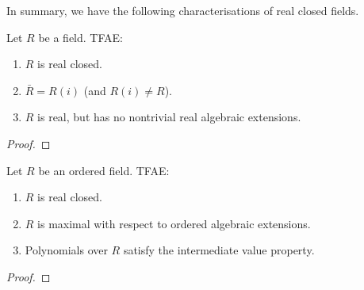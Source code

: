 In summary, we have the following characterisations of real closed fields.

\begin{theorem}
  \label{thm:RCF_tfae}
  Let $R$ be a field. TFAE:
  \begin{enumerate}
    \item $R$ is real closed.
    \item $\bar{R}=R(i)$ (and $R(i)\neq R$).
    \item $R$ is real, but has no nontrivial real algebraic extensions.
  \end{enumerate}
\end{theorem}
\begin{proof}
\end{proof}

\begin{theorem}
  \label{thm:RCF_tfae_ord}
  \leanok
  Let $R$ be an ordered field. TFAE:
  \begin{enumerate}
    \item $R$ is real closed.
    \item $R$ is maximal with respect to ordered algebraic extensions.
    \item Polynomials over $R$ satisfy the intermediate value property.
  \end{enumerate}
\end{theorem}
\begin{proof}
  \leanok
\end{proof}



